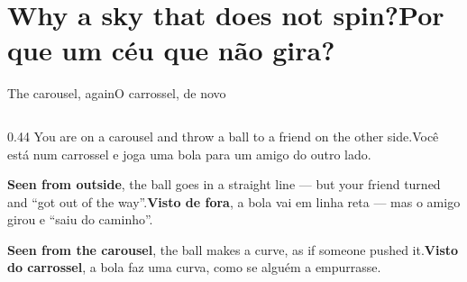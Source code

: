 \documentclass[aspectratio=169,11pt]{beamer}
\newcommand{\tr}[2]{\ifEN#2\else#1\fi}
\newcommand{\bnum}[1]{\textbf{\textcolor{mTeal}{#1}}}
\begin{document}
\section{\tr{Por que um céu que não gira?}{Why a sky that does not spin?}}

\begin{frame}{\tr{O carrossel, de novo}{The carousel, again}}
  \begin{columns}[T]
    \begin{column}{0.44\textwidth}
      \small
      \tr{Você está num carrossel e joga uma bola para um amigo do outro lado.}{You are on a
      carousel and throw a ball to a friend on the other side.}
      \medskip

      \tr{\bnum{Visto de fora}, a bola vai em linha reta --- mas o amigo girou e ``saiu do
      caminho''.}{\bnum{Seen from outside}, the ball goes in a straight line --- but your friend
      turned and ``got out of the way''.}
      \medskip

      \tr{\bnum{Visto do carrossel}, a bola faz uma curva, como se alguém a empurrasse.}{\bnum{Seen
      from the carousel}, the ball makes a curve, as if someone pushed it.}
      \medskip


\end{column}
\end{columns}
\end{frame}
\end{document}
